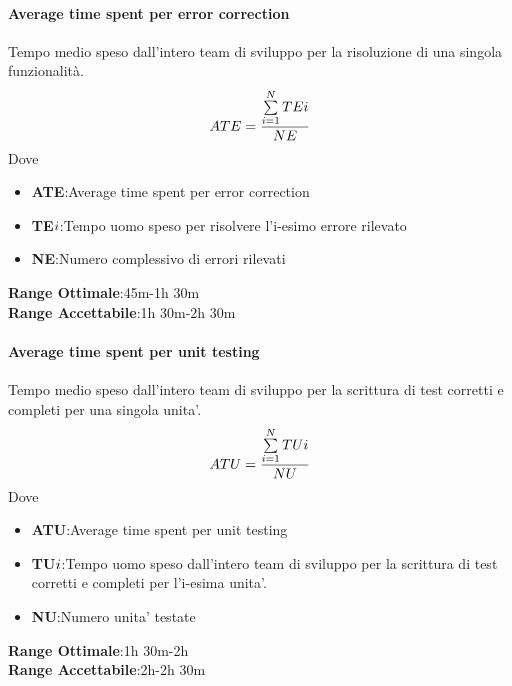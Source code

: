 \paragraph{Average time spent per error correction}
\begin{flushleft}
Tempo medio speso dall'intero team di sviluppo per la risoluzione di una singola funzionalità.
	$$ATE=\frac{\sum\limits_{i=1}^N TE{\small{i}}}{NE}$$
Dove
\begin{itemize}
	\item{\textbf{ATE}}:Average time spent per error correction
	\item{\textbf{TE${\small{i}}$}}:Tempo uomo speso per risolvere l'i-esimo errore rilevato
	\item{\textbf{NE}}:Numero complessivo di errori rilevati
\end{itemize}
\textbf{Range Ottimale}:45m-1h 30m \\
\textbf{Range Accettabile}:1h 30m-2h 30m
\end{flushleft}
\paragraph{Average time spent per unit testing}
\begin{flushleft}
Tempo medio speso dall'intero team di sviluppo per la scrittura di test corretti e completi per una singola unita'.
	$$ATU=\frac{\sum\limits_{i=1}^N TU{\small{i}}}{NU}$$
Dove
\begin{itemize}
	\item{\textbf{ATU}}:Average time spent per unit testing
	\item{\textbf{TU${\small{i}}$}}:Tempo uomo speso dall'intero team di sviluppo per la scrittura di test corretti e completi per l'i-esima unita'.
	\item{\textbf{NU}}:Numero unita' testate
\end{itemize}
\textbf{Range Ottimale}:1h 30m-2h \\
\textbf{Range Accettabile}:2h-2h 30m
\end{flushleft}
\pagebreak
\pagebreak